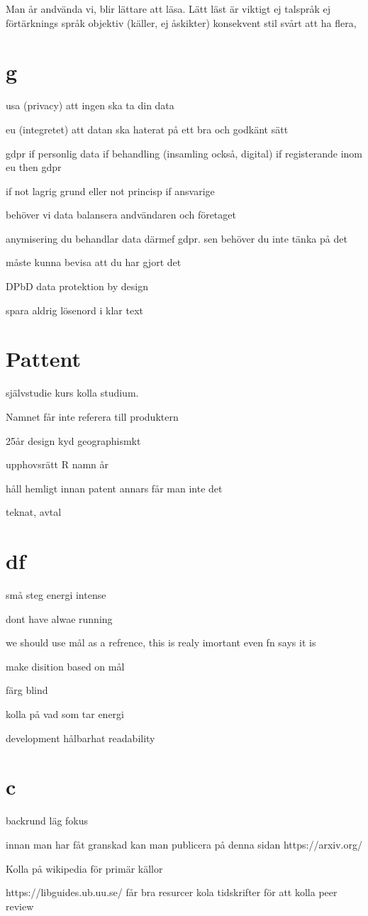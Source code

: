 \documentclass{article}
\begin{document}
Man år andvända vi, blir lättare att läsa. Lätt läst är viktigt
ej talspråk
ej förtärknings språk
objektiv (käller, ej åskikter)
konsekvent stil svårt att ha flera,

\section{g}
usa (privacy)
att ingen ska ta din data 

eu (integretet)
att datan ska haterat på ett bra och godkänt sätt

gdpr 
if personlig data
if behandling (insamling också, digital)
if registerande inom eu
then gdpr

if not lagrig grund
eller not princisp
    if ansvarige
    
behöver vi data
balansera andvändaren och företaget

anymisering du behandlar data därmef gdpr. sen behöver du inte tänka på det

måste kunna bevisa att du har gjort det

DPbD data protektion by design

spara aldrig lösenord i klar text

\section{Pattent}
självstudie kurs kolla studium.

Namnet får inte referera till produktern

25år design kyd geographismkt

upphovsrätt R namn år

håll hemligt innan patent annars får man inte det

teknat, avtal

\section{df}
små steg energi intense

dont have alwae running

we should use mål as a refrence, this is realy imortant even fn says it is

make disition based on mål

färg blind

kolla på vad som tar energi

development hålbarhat
readability

\section{c}

backrund läg fokus

innan man har fåt granskad kan man publicera på denna sidan https://arxiv.org/

Kolla på wikipedia för primär källor

https://libguides.ub.uu.se/  får bra resurcer
kola tidskrifter för att kolla peer review

\end{document}
